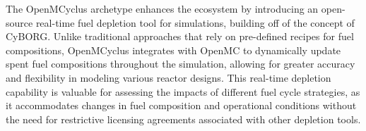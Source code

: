 The OpenMCyclus archetype \cite{openmcyclus_paper} enhances the \cyclus
ecosystem by introducing an open-source real-time fuel depletion tool for
\cyclus simulations, building off of the concept of CyBORG. Unlike traditional
approaches that rely on pre-defined recipes for fuel compositions, OpenMCyclus
integrates with OpenMC \cite{romano_openmc_2015} to dynamically update spent
fuel compositions throughout the simulation, allowing for greater accuracy and
flexibility in modeling various reactor designs. This real-time depletion
capability is valuable for assessing the impacts of different fuel cycle
strategies, as it accommodates changes in fuel composition and operational
conditions without the need for restrictive licensing agreements associated
with other depletion tools.



